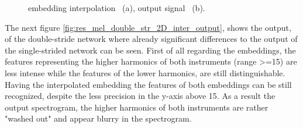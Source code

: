 \begin{figure}[htb!]
    \centering
    \caption{embedding interpolation ~(a), output signal ~(b).}
    \label{fig:res_mel_single_str_2D_inter_output}
\end{figure}

The next figure \ref{fig:res_mel_double_str_2D_inter_output}, shows the output, of the double-stride network where already significant differences to the output of the single-strided network can be seen. First of all regarding the embeddings, the features representing the higher harmonics of both instruments (range >=15) are less intense while the features of the lower harmonics, are still distinguishable. Having the interpolated embedding the features of both embeddings can be still recognized, despite the less precision in the y-axis above 15. As a result the output spectrogram, the higher harmonics of both instruments are rather "washed out" and appear blurry in the spectrogram. 

